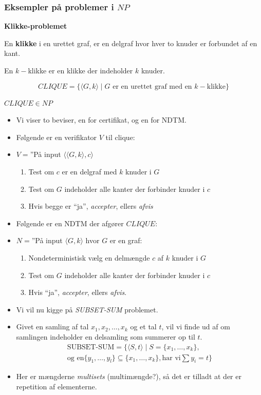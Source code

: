 \begin{frame}[allowframebreaks]
	\frametitle{Eksempler på problemer i $NP$}

	\item \textbf{Klikke-problemet}
	\item En \textbf{klikke} i en urettet graf, er en delgraf hvor hver to knuder er forbundet af en kant.
	\item En $k-$klikke er en klikke der indeholder $k$ knuder.

	\begin{equation}
		CLIQUE = \{\langle G, k \rangle \mid G \text{ er en urettet graf med en }k-\text{klikke}\}
	\end{equation}

	\begin{theorem}
		$CLIQUE \in NP$
	\end{theorem}
	\begin{itemize}
		\item Vi viser to beviser, en for certifikat, og en for NDTM.
		\item Følgende er en verifikator $V$ til clique:
		\item $V = $''På input \(\langle \langle G, k \rangle , c \rangle \)
		      \begin{enumerate}
			      \item Test om $c$ er en delgraf med $k$ knuder i $G$
			      \item Test om $G$ indeholder alle kanter der forbinder knuder i $c$
			      \item Hvis begge er ``ja'', \textit{accepter}, ellers \textit{afvis}
		      \end{enumerate}
		\item Følgende er en NDTM der afgører $CLIQUE$:
		\item $N = $''På input $\langle G , k \rangle $ hvor $G$ er en graf:
		      \begin{enumerate}
			      \item Nondeterministisk vælg en delmængde $c$ af $k$ knuder i $G$
			      \item Test om $G$ indeholder alle kanter der forbinder knuder i $c$
			      \item Hvis ``ja'', \textit{accepter}, ellers \textit{afvis}.
		      \end{enumerate}

		\item Vi vil nu kigge på \textit{SUBSET-SUM} problemet.
		\item Givet en samling af tal $x_{1}, x_{2}, \ldots, x_{k}$ og et tal $t$, vil vi finde ud af om samlingen indeholder en delsamling som summerer op til $t$.
		      \begin{align*}
			      \text{SUBSET-SUM} = \{\langle S , t \rangle \mid S = \{x_{1}, \ldots, x_{k}\}, \\
			      \text{og en} \{y_{1}, \ldots, y_{l}\} \subseteq \{x_{1}, \ldots, x_{k}\}, \text{har vi} \sum{y_{i}}= t\}
		      \end{align*}
		\item Her er mængderne \textit{multisets} (multimængde?), så det er tilladt at der er repetition af elementerne.
	\end{itemize}


\end{frame}

